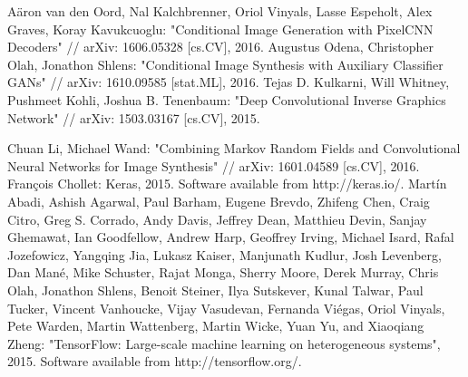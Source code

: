 \documentclass[a4paper]{article}
\begin{document}
\begin{thebibliography}{99}
		 A\"aron van den Oord, Nal Kalchbrenner, Oriol Vinyals, Lasse Espeholt, Alex Graves, Koray Kavukcuoglu: "Conditional Image Generation with PixelCNN Decoders" // arXiv: 1606.05328 [cs.CV], 2016.
		 Augustus Odena, Christopher Olah, Jonathon Shlens: "Conditional Image Synthesis with Auxiliary Classifier GANs" // arXiv: 1610.09585 [stat.ML], 2016.
		 Tejas D. Kulkarni, Will Whitney, Pushmeet Kohli, Joshua B. Tenenbaum: "Deep Convolutional Inverse Graphics Network" // arXiv: 1503.03167 [cs.CV], 2015.
		
		 Chuan Li, Michael Wand: "Combining Markov Random Fields and Convolutional Neural Networks for Image Synthesis" // arXiv: 1601.04589 [cs.CV], 2016.
		 François Chollet: Keras, 2015. Software available from http://keras.io/.
		 Martín Abadi, Ashish Agarwal, Paul Barham, Eugene Brevdo, Zhifeng Chen, Craig Citro, Greg S. Corrado, Andy Davis, Jeffrey Dean, Matthieu Devin, Sanjay Ghemawat, Ian Goodfellow, Andrew Harp, Geoffrey Irving, Michael Isard, Rafal Jozefowicz, Yangqing Jia, Lukasz Kaiser, Manjunath Kudlur, Josh Levenberg, Dan Mané, Mike Schuster, Rajat Monga, Sherry Moore, Derek Murray, Chris Olah, Jonathon Shlens, Benoit Steiner, Ilya Sutskever, Kunal Talwar, Paul Tucker, Vincent Vanhoucke, Vijay Vasudevan, Fernanda Viégas, Oriol Vinyals, Pete Warden, Martin Wattenberg, Martin Wicke, Yuan Yu, and Xiaoqiang Zheng: "TensorFlow: Large-scale machine learning on heterogeneous systems", 2015. Software available from http://tensorflow.org/.
	\end{thebibliography}
	
\end{document}
